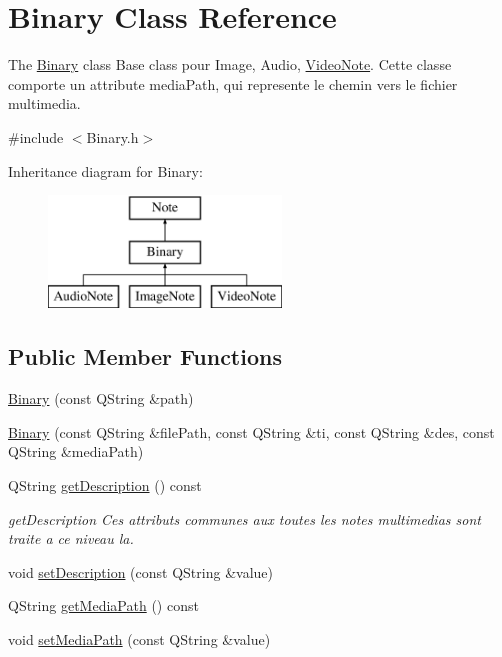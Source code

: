 \hypertarget{class_binary}{\section{Binary Class Reference}
\label{class_binary}
}


The \hyperlink{class_binary}{Binary} class Base class pour Image, Audio, \hyperlink{class_video_note}{Video\-Note}. Cette classe comporte un attribute media\-Path, qui represente le chemin vers le fichier multimedia.  




{\ttfamily \#include $<$Binary.\-h$>$}

Inheritance diagram for Binary\-:\begin{figure}[H]
\begin{center}
\leavevmode
\includegraphics[height=3.000000cm]{class_binary}
\end{center}
\end{figure}
\subsection*{Public Member Functions}
\begin{DoxyCompactItemize}
\item 
\hyperlink{class_binary_a6e2a3aac2d81738f36d7e2a994ec8876}{Binary} (const Q\-String \&path)
\item 
\hyperlink{class_binary_a26e521e3c28bddef26629bcb87b2159e}{Binary} (const Q\-String \&file\-Path, const Q\-String \&ti, const Q\-String \&des, const Q\-String \&media\-Path)
\item 
Q\-String \hyperlink{class_binary_ad1a563026885b1da3ef06d420e34b4f2}{get\-Description} () const 
\begin{DoxyCompactList}\small\item\em get\-Description Ces attributs communes aux toutes les notes multimedias sont traite a ce niveau la. \end{DoxyCompactList}\item 
void \hyperlink{class_binary_a1375f8ef085b0f1e107f1f0720009201}{set\-Description} (const Q\-String \&value)
\item 
Q\-String \hyperlink{class_binary_ae5793d30e59c35b5b86a6187bb9f129b}{get\-Media\-Path} () const 
\item 
void \hyperlink{class_binary_ae158f99570c29d1400b38af53d5e80a3}{set\-Media\-Path} (const Q\-String \&value)
\end{DoxyCompactItemize}
